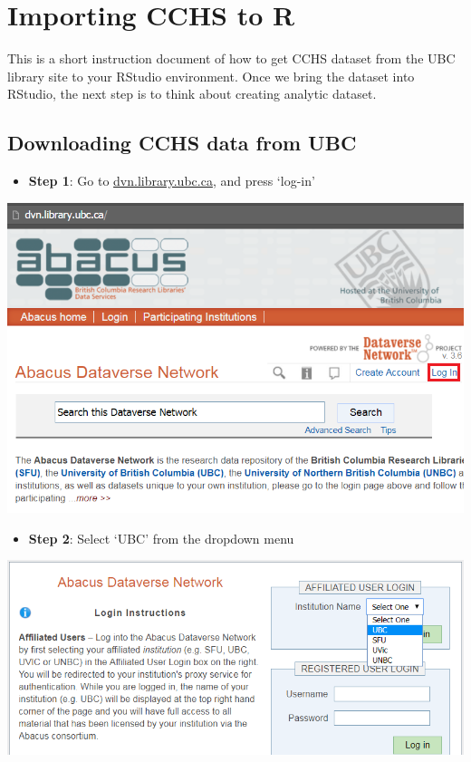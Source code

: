 \documentclass[
]{book}
\providecommand{\tightlist}{%
  \setlength{\itemsep}{0pt}\setlength{\parskip}{0pt}}
\begin{document}
\hypertarget{importing-cchs-to-r}{%
\chapter{Importing CCHS to R}\label{importing-cchs-to-r}}

This is a short instruction document of how to get CCHS dataset from the UBC library site to your RStudio environment. Once we bring the dataset into RStudio, the next step is to think about creating analytic dataset.

\hypertarget{downloading-cchs-data-from-ubc}{%
\section{Downloading CCHS data from UBC}\label{downloading-cchs-data-from-ubc}}

\begin{itemize}
\tightlist
\item
  \textbf{Step 1}: Go to \href{http://dvn.library.ubc.ca}{dvn.library.ubc.ca}, and press `log-in'
\end{itemize}

\includegraphics[width=0.65\linewidth]{images/abacus1}

\begin{itemize}
\tightlist
\item
  \textbf{Step 2}: Select `UBC' from the dropdown menu
\end{itemize}

\includegraphics[width=0.65\linewidth]{images/abacus2}
\end{document}
